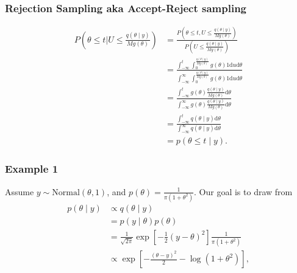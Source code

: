 \documentclass{beamer}
\begin{document}
\begin{frame}[fragile]
\frametitle{Rejection Sampling aka Accept-Reject sampling}
\begin{align*}
P\left( \theta \le t \bigg\rvert U \le \frac{q(\theta \mid y)}{M g(\theta) } \right) 
&= \frac{P\left( \theta \le t , U \le \frac{q(\theta \mid y)}{M g(\theta) } \right)}{P\left(U \le \frac{q(\theta \mid y)}{M g(\theta) } \right)} \\
&= \frac{\int_{-\infty}^t \int_0^{ \frac{q(\theta \mid y)}{M g(\theta) } }g(\theta)1 \text{d}u \text{d}\theta }{ \int_{-\infty}^{\infty} \int_0^{ \frac{q(\theta \mid y)}{M g(\theta) } }g(\theta)1 \text{d}u \text{d}\theta } \\
&= \frac{\int_{-\infty}^t g(\theta)\frac{q(\theta \mid y)}{M g(\theta) }  \text{d}\theta }{ \int_{-\infty}^{\infty} g(\theta)  \frac{q(\theta \mid y)}{M g(\theta) } \text{d}\theta } \\
&= \frac{\int_{-\infty}^t q(\theta \mid y)  \text{d}\theta }{ \int_{-\infty}^{\infty}  q(\theta \mid y)\text{d}\theta } \\
&= p(\theta \le t \mid y).
\end{align*}
\end{frame}


\begin{frame}[fragile]
\frametitle{Example 1}

Assume $y \sim \text{Normal}(\theta,1)$, and $p(\theta) = \frac{1}{\pi(1+\theta^2)}$. 
Our goal is to draw from
\begin{align*}
p(\theta \mid y) &\propto q(\theta\mid y) \\
&= p(y \mid \theta) p(\theta) \\
&= \frac{1}{\sqrt{2\pi}} \exp\left[-\frac{1}{2} (y-\theta)^2 \right] \frac{1}{\pi(1+\theta^2)} \\
&\propto \exp\left[-\frac{(\theta - y)^2}{2} - \log(1 + \theta^2) \right],
\end{align*}


\end{frame}
\end{document}
